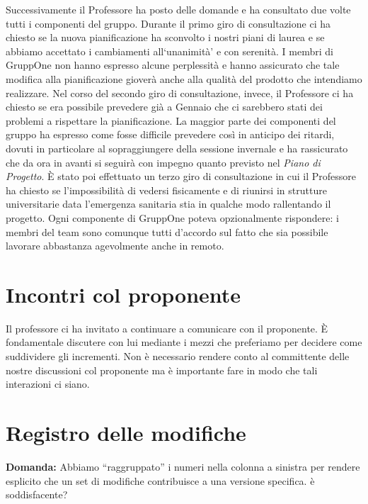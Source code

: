 \documentclass{article}
\begin{document}
Successivamente il Professore ha posto delle domande e ha consultato due volte tutti i componenti del gruppo.
Durante il primo giro di consultazione ci ha chiesto se la nuova pianificazione ha sconvolto i nostri piani di laurea e se abbiamo accettato i cambiamenti all`unanimità' e con serenità.
I membri di GruppOne non hanno espresso alcune perplessità e hanno assicurato che tale modifica alla pianificazione gioverà anche alla qualità del prodotto che intendiamo realizzare.
Nel corso del secondo giro di consultazione, invece, il Professore ci ha chiesto se era possibile prevedere già a Gennaio che ci sarebbero stati dei problemi a rispettare la pianificazione.
La maggior parte dei componenti del gruppo ha espresso come fosse difficile prevedere così in anticipo dei ritardi, dovuti in particolare al sopraggiungere della sessione invernale e ha rassicurato che da ora in avanti si seguirà con impegno quanto previsto nel \textit{Piano di Progetto}.
È stato poi effettuato un terzo giro di consultazione in cui il Professore ha chiesto se l'impossibilità di vedersi fisicamente e di riunirsi in strutture universitarie data l'emergenza sanitaria stia in qualche modo rallentando il progetto. Ogni componente di GruppOne poteva opzionalmente rispondere: i membri del team sono comunque tutti d'accordo sul fatto che sia possibile lavorare abbastanza agevolmente anche in remoto.

\section{Incontri col proponente}%
\label{sec:incontri_col_proponente}

Il professore ci ha invitato a continuare a comunicare con il proponente.
È fondamentale discutere con lui mediante i mezzi che preferiamo per decidere come suddividere gli incrementi.
Non è necessario rendere conto al committente delle nostre discussioni col proponente ma è importante fare in modo che tali interazioni ci siano.

\section{Registro delle modifiche}%
\label{sec:registro_delle_modifiche}

\textbf{Domanda:} Abbiamo “raggruppato” i numeri nella colonna a sinistra per rendere esplicito che un set di modifiche contribuisce a una versione specifica. è soddisfacente?\\
\end{document}

